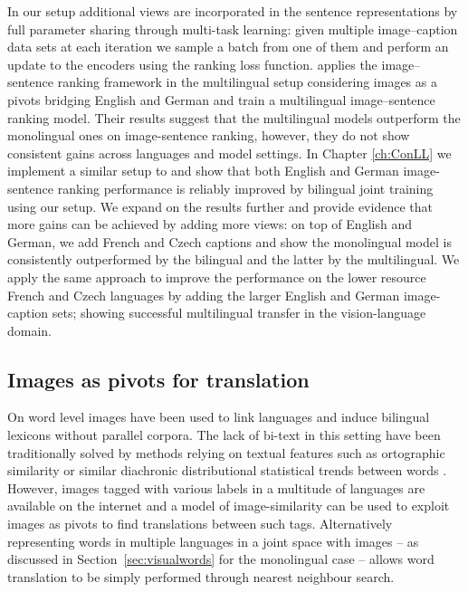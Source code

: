 In our setup additional views are incorporated in the sentence representations
by full parameter sharing through multi-task learning:
given multiple image--caption data sets at each iteration we sample
a batch from one of them and perform an update to the encoders
using the ranking loss function.
\cite{gella2017image} applies the image--sentence ranking framework in the multilingual setup
considering images as a pivots bridging English and German and train a multilingual
image--sentence ranking model.
Their results suggest that the multilingual models outperform the monolingual ones on image-sentence
ranking, however, they do not show consistent gains across languages and model settings.
In Chapter \ref{ch:ConLL} we implement a similar setup to \cite{gella2017image}
and  show that both English and German image-sentence
ranking performance is reliably improved by bilingual joint training using our setup.
We expand on the results further and provide evidence that more gains can be
achieved by adding more views: on top of English and German, we
add French and Czech captions and show the monolingual model is consistently
outperformed by the bilingual and the latter by the multilingual.
We apply the same approach to improve the performance on the lower resource
French and Czech languages by adding the larger
English and German image-caption sets; showing successful multilingual
transfer in the vision-language domain.


\subsection{Images as pivots for translation}
\label{sec:imgpivot}

On word level images have been used to link languages and induce bilingual
lexicons without parallel corpora. The lack of bi-text in this setting have
been traditionally solved by methods relying on textual features
such as ortographic similarity \citep{haghighi2008learning} or similar diachronic distributional
statistical trends between words \citep{schafer2002inducing}.
However, images tagged with various labels in a multitude of languages are
available on the internet and a model of image-similarity can be used to exploit
images as pivots to find translations between such tags. Alternatively representing words in multiple
languages in a joint space with images
-- as discussed in Section~\ref{sec:visualwords} for the monolingual case --
allows word translation to be simply performed through nearest neighbour search.

